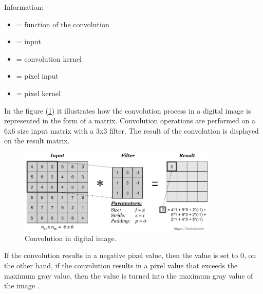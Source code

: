 \noindent Information: 
\begin{itemize}[noitemsep, topsep=0pt]
    \item[]{ = function of the convolution}
    \item[]{ = input}
    \item[]{ = convolution kernel}
    \item[]{ = pixel input}
    \item[]{ = pixel kernel}
\end{itemize}


In the figure (\ref{fig:conv3}) it illustrates how the convolution process in a digital image is represented in the form of a matrix. Convolution operations are performed on a 6x6 size input matrix with a 3x3 filter. The result of the convolution is displayed on the result matrix.
\begin{figure}[ht]
    \includegraphics[width=0.85\textwidth, center]{images/convolution-operation.png}
    \caption{Convolution in digital image.}
    \label{fig:conv3}
\end{figure}


If the convolution results in a negative pixel value, then the value is set to 0, on the other hand, if the convolution results in a pixel value that exceeds the maximum gray value, then the value is turned into the maximum gray value of the image \cite{book:sutoyo}.
 

